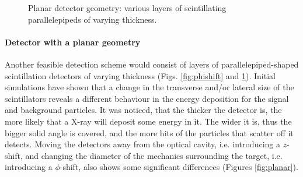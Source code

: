 \documentclass[12pt]{article}
\begin{document}
\begin{figure}[!htbp]
\begin{subfigure}{.485\textwidth}
	\label{fig:zshift}
\end{subfigure}	
\caption{Planar detector geometry: various layers of scintillating parallelepipeds of varying thickness.}
\label{fig:planarsetup}
\end{figure}

\paragraph{Detector with a planar geometry}
Another feasible detection scheme would consist of layers of parallelepiped-shaped scintillation detectors of varying thickness (Figs. \ref{fig:phishift} and \ref{fig:zshift}). Initial simulations have shown that a change in the transverse and/or lateral size of the scintillators reveals a different behaviour in the energy deposition for the signal and background particles. It was noticed, that the thicker the detector is, the more likely that a X-ray will deposit some energy in it. The wider it is, thus the bigger solid angle is covered, and the more hits of the particles that scatter off it detects. Moving the detectors away from the optical cavity, i.e. introducing a $z$-shift, and changing the diameter of the mechanics surrounding the target, i.e. introducing a $\phi$-shift, also shows some significant differences (Figures \ref{fig:planar}).
\end{document}
